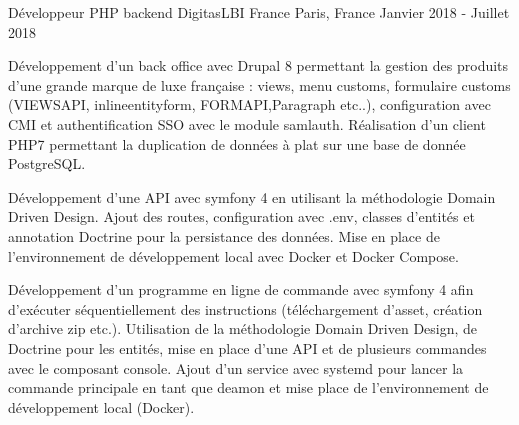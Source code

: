 \cventry
{Développeur PHP backend} %
{DigitasLBI France} %
{Paris, France} %
{Janvier 2018 - Juillet 2018} %
{
\begin{cvitems} %
    \item
    {
        Développement d'un back office avec Drupal 8 permettant la gestion des produits d'une grande marque de luxe française : views,
        menu customs, formulaire customs (VIEWS\textunderscore API, inline\textunderscore entity\textunderscore form, FORM\textunderscore API,Paragraph etc..), configuration avec CMI et authentification SSO
        avec le module samlauth. Réalisation d'un client PHP7 permettant la duplication de données à plat sur une base de donnée PostgreSQL.
    }
    \item
    {
        Développement d'une API avec symfony 4 en utilisant la méthodologie Domain Driven Design. Ajout des routes, configuration avec .env, classes
        d'entités et annotation Doctrine pour la persistance des données. Mise en place de l'environnement de développement local avec Docker et Docker Compose.
    }
    \item
    {
        Développement d'un programme en ligne de commande avec symfony 4 afin d'exécuter séquentiellement des instructions (téléchargement d'asset, création d'archive zip etc.).
        Utilisation de la méthodologie Domain Driven Design, de Doctrine pour les entités,  mise en place d'une API et de plusieurs commandes avec le composant console.
        Ajout d'un service avec systemd pour lancer la commande principale en tant que deamon et mise place de l'environnement de développement local (Docker).
    }
\end{cvitems}
}